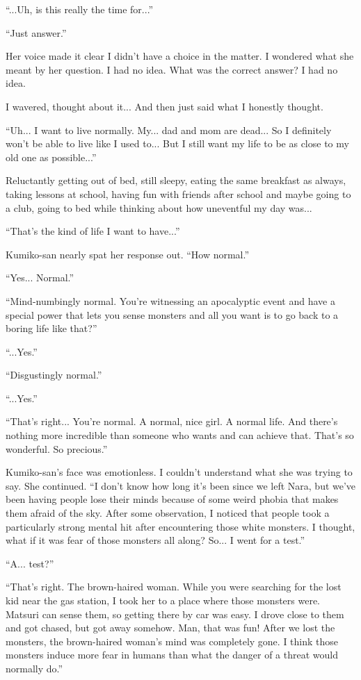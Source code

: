 ``...Uh, is this really the time for...''

``Just answer.''

Her voice made it clear I didn't have a choice in the matter. I wondered what she meant by her question. I had no idea. What was the correct answer? I had no idea.

I wavered, thought about it... And then just said what I honestly thought.

``Uh... I want to live normally. My... dad and mom are dead... So I definitely won't be able to live like I used to... But I still want my life to be as close to my old one as possible...''

Reluctantly getting out of bed, still sleepy, eating the same breakfast as always, taking lessons at school, having fun with friends after school and maybe going to a club, going to bed while thinking about how uneventful my day was...

``That's the kind of life I want to have...''

Kumiko-san nearly spat her response out.  ``How normal.''

``Yes... Normal.''

``Mind-numbingly normal. You're witnessing an apocalyptic event and have a special power that lets you sense monsters and all you want is to go back to a boring life like that?''

``...Yes.''

``Disgustingly normal.''

``...Yes.''

``That's right... You're normal. A normal, nice girl. A normal life. And there's nothing more incredible than someone who wants and can achieve that. That's so wonderful. So precious.''

Kumiko-san's face was emotionless. I couldn't understand what she was trying to say. She continued.  ``I don't know how long it's been since we left Nara, but we've been having people lose their minds because of some weird phobia that makes them afraid of the sky. After some observation, I noticed that people took a particularly strong mental hit after encountering those white monsters. I thought, what if it was fear of those monsters all along? So... I went for a test.''

``A... test?''

``That's right. The brown-haired woman. While you were searching for the lost kid near the gas station, I took her to a place where those monsters were. Matsuri can sense them, so getting there by car was easy. I drove close to them and got chased, but got away somehow. Man, that was fun! After we lost the monsters, the brown-haired woman's mind was completely gone. I think those monsters induce more fear in humans than what the danger of a threat would normally do.''

